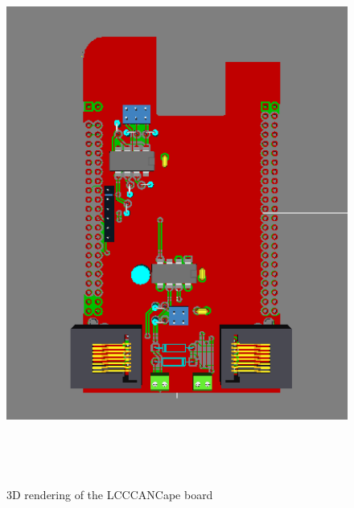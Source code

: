 \begin{figure}[hbpt]\begin{centering}%
\includegraphics[height=7in]{LCCCANCape3DTop.png}
\caption{3D rendering of the LCCCANCape board}
\end{centering}\end{figure}

